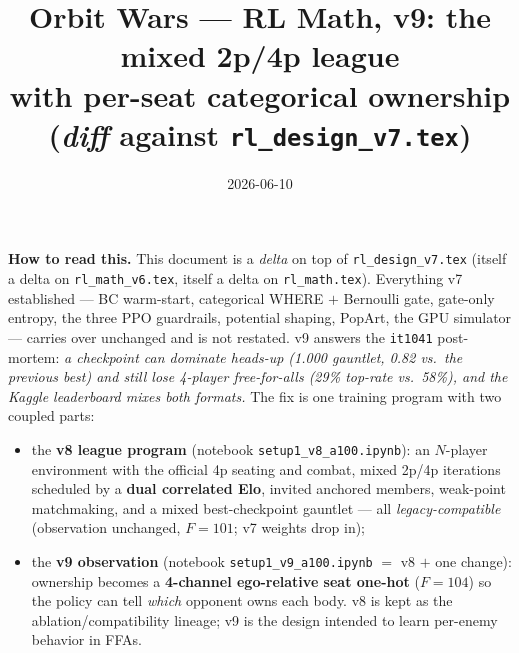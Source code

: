 \documentclass[11pt]{article}
\title{\textbf{Orbit Wars --- RL Math, v9: the mixed 2p/4p league\\ with per-seat categorical ownership (\emph{diff} against \texttt{rl\_design\_v7.tex})}}
\author{}
\date{2026-06-10}
\newcommand{\cd}[1]{\texttt{#1}}
\begin{document}
\maketitle

\noindent\textbf{How to read this.} This document is a \emph{delta} on top of
\texttt{rl\_design\_v7.tex} (itself a delta on \texttt{rl\_math\_v6.tex}, itself a delta on
\texttt{rl\_math.tex}). Everything v7 established --- BC warm-start, categorical WHERE $+$
Bernoulli gate, gate-only entropy, the three PPO guardrails, potential shaping, PopArt, the
GPU simulator --- carries over unchanged and is not restated. v9 answers the \texttt{it1041}
post-mortem: \emph{a checkpoint can dominate heads-up (1.000 gauntlet, 0.82 vs.\ the previous
best) and still lose 4-player free-for-alls (29\% top-rate vs.\ 58\%), and the Kaggle leaderboard
mixes both formats.} The fix is one training program with two coupled parts:
\begin{itemize}[nosep,leftmargin=1.6em]
\item the \textbf{v8 league program} (notebook \cd{setup1\_v8\_a100.ipynb}): an $N$-player
  environment with the official 4p seating and combat, mixed 2p/4p iterations scheduled by a
  \textbf{dual correlated Elo}, invited anchored members, weak-point matchmaking, and a mixed
  best-checkpoint gauntlet --- all \emph{legacy-compatible} (observation unchanged, $F{=}101$;
  v7 weights drop in);
\item the \textbf{v9 observation} (notebook \cd{setup1\_v9\_a100.ipynb} $=$ v8 $+$ one change):
  ownership becomes a \textbf{4-channel ego-relative seat one-hot} ($F{=}104$) so the policy can
  tell \emph{which} opponent owns each body. v8 is kept as the ablation/compatibility lineage; v9
  is the design intended to learn per-enemy behavior in FFAs.
\end{itemize}
\end{document}
